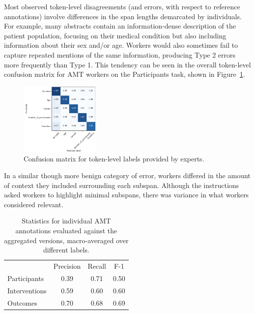 \documentclass[11pt,a4paper]{article}
\begin{document}
Most observed token-level disagreements (and errors, with respect to reference annotations) involve differences in the span lengths demarcated by individuals. 
For example, many abstracts contain an information-dense description of the patient population, focusing on their medical condition but also including information about their sex and/or age.
Workers would also sometimes fail to capture repeated mentions of the same information, producing Type 2 errors more frequently than Type 1.
This tendency can be seen in the overall token-level confusion matrix for AMT workers on the Participants task, shown in Figure~\ref{fig:p_confusion}. %

\begin{figure}
\centering
\includegraphics[width=0.35\textwidth]{figs/p_conf_mat.png}
\caption{Confusion matrix for token-level labels provided by experts.}
\label{fig:p_confusion}
\end{figure}

In a similar though more benign category of error, workers differed in the amount of context they included surrounding each subspan.
Although the instructions asked workers to highlight minimal subspans, there was variance in what workers considered relevant.

\begin{table}[h]%
    \centering
    \small
    \begin{tabular}{ l c c c } 
        \textbf{} & Precision & Recall & F-1 \\
        \cline{2-4}
        Participants  & 0.39 & 0.71 & 0.50 \\
        Interventions & 0.59 & 0.60 & 0.60 \\ 
        Outcomes      & 0.70 & 0.68 & 0.69 \\ 
    \end{tabular}
    \caption{Statistics for individual AMT annotations evaluated against the aggregated versions, macro-averaged over different labels.}
   	\label{tab:amt_semantic_stats}
\end{table}
\end{document}
